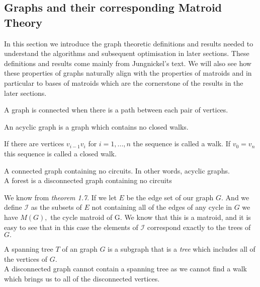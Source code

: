\documentclass[../main.tex]{subfiles}
\begin{document}
\subsection{Graphs and their corresponding Matroid Theory}
In this section we introduce the graph theoretic definitions and results needed to understand the algorithms and subsequent optimisation in later sections. These definitions and results come mainly from Jungnickel's\cite{jungnickel} text. We will also see how these properties of graphs naturally align with the properties of matroids and in particular to bases of matroids which are the cornerstone of the results in the later sections.

\begin{defn}[Connected]
A graph is connected when there is a path between each pair of vertices.
\end{defn}
 
\begin{defn}[Acyclic]
An acyclic graph is a graph which contains no closed walks.
\end{defn}

\begin{defn}[Walk]
If there are vertices $v_{i-1}v_i$ for $i = 1, ..., n$ the sequence is called a walk. If $v_0 = v_n$ this sequence is called a closed walk.
\end{defn} 

\begin{defn}[Tree]
A connected graph containing no circuits. In other words, acyclic graphs.\\
\noindent A forest is a disconnected graph containing no circuits\\
\end{defn}

\noindent We know from \textit{theorem 1.7}. If we let $E$ be the edge set of our graph $G.$ And we define $\mathcal{I}$ as the subsets of $E$ not containing all of the edges of any cycle in $G$ we have $M(G),$ the cycle matroid of G. We know that this is a matroid, and it is easy to see that in this case the elements of $\mathcal{I}$ correspond exactly to the trees of $G.$

 
\begin{defn}
A spanning tree $T$ of an graph $G$ is a subgraph that is a \textit{tree} which includes all of the vertices of $G.$\\
\noindent A disconnected graph cannot contain a spanning tree as we cannot find a walk which brings us to all of the disconnected vertices.
\end{defn}
\end{document}

